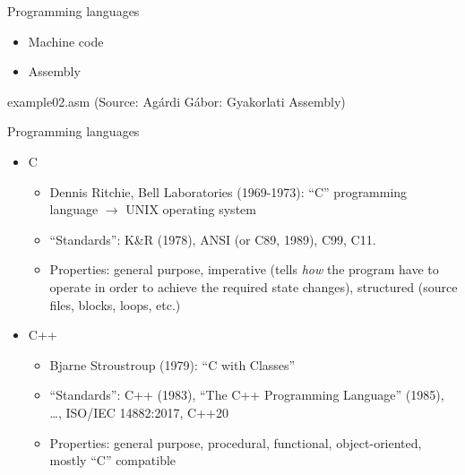 \documentclass[usenames,dvipsnames,aspectratio=169]{beamer}
\begin{document}
\begin{frame}[fragile]{Programming languages}
  \begin{itemize}
    \item Machine code
    \item Assembly
  \end{itemize}
  \begin{exampleblock}{example02.asm (Source: Agárdi Gábor: Gyakorlati Assembly)}
    \tiny
    \vspace{-0.3cm}
    
    \vspace{-0.3cm}
  \end{exampleblock}
\end{frame}

\begin{frame}{Programming languages}
  \begin{itemize}
    \item C
    \begin{itemize}
      \item Dennis Ritchie, Bell Laboratories (1969-1973): ``C'' programming language $\to$ UNIX operating system
      \item ``Standards'': K\&R (1978), ANSI (or C89, 1989), C99, C11.
      \item Properties: general purpose, imperative (tells \emph{how} the program have to operate in order to achieve the required state changes), structured (source files, blocks, loops, etc.)   
    \end{itemize}
    \item C++
    \begin{itemize}
      \item Bjarne Stroustroup (1979): ``C with Classes''
      \item ``Standards'': C++ (1983), ``The C++ Programming Language'' (1985), \dots, ISO/IEC 14882:2017, C++20
      \item Properties: general purpose, procedural, functional, object-oriented, mostly ``C'' compatible
    \end{itemize}
  \end{itemize}
\end{frame}
\end{document}
